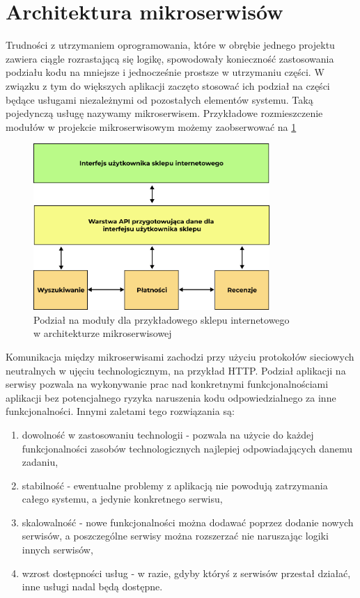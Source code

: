 \documentclass{SGGW-thesis}
\begin{document}
\section{Architektura mikroserwisów}

Trudności z utrzymaniem oprogramowania, które w obrębie jednego projektu zawiera ciągle rozrastającą się logikę, spowodowały konieczność zastosowania podziału kodu na mniejsze i jednocześnie prostsze w utrzymaniu części.
W związku z tym do większych aplikacji zaczęto stosować ich podział na części będące usługami niezależnymi od pozostałych elementów systemu. Taką pojedynczą usługę nazywamy mikroserwisem. Przykładowe rozmieszczenie modułów w projekcie mikroserwisowym możemy zaobserwować na \cref{fig:microservices_diagram}

\vfill
\clearpage

\begin{figure}[h]
	\centering
	\captionsetup{justification=centering}
	\includegraphics[width=0.8\textwidth]{microservices_diagram.png}
	\caption{Podział na moduły dla przykładowego sklepu internetowego \\ w architekturze mikroserwisowej}
	\label{fig:microservices_diagram}
\end{figure}


Komunikacja między mikroserwisami zachodzi przy użyciu protokołów sieciowych neutralnych w ujęciu technologicznym, na przykład HTTP. Podział aplikacji na serwisy pozwala na wykonywanie prac nad konkretnymi funkcjonalnościami aplikacji bez potencjalnego ryzyka naruszenia kodu odpowiedzialnego za inne funkcjonalności. Innymi zaletami tego rozwiązania są:

\begin{enumerate}
	\item dowolność w zastosowaniu technologii - pozwala na użycie do każdej funkcjonalności zasobów technologicznych najlepiej odpowiadających danemu zadaniu,
	\item stabilność - ewentualne problemy z aplikacją nie powodują zatrzymania całego systemu, a jedynie konkretnego serwisu,
	\item skalowalność - nowe funkcjonalności można dodawać poprzez dodanie nowych serwisów, a poszczególne serwisy można rozszerzać nie naruszając logiki innych serwisów,
	\item wzrost dostępności usług - w razie, gdyby któryś z serwisów przestał działać, inne usługi nadal będą dostępne.
\end{enumerate}
\end{document}
